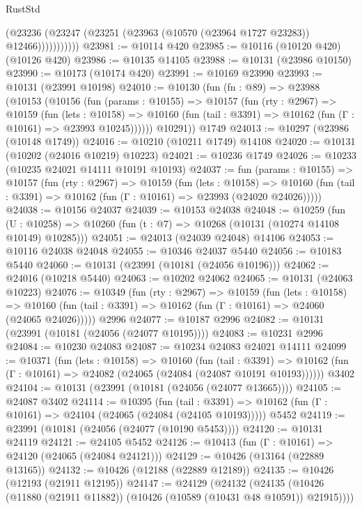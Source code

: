 \begin{lexlean}{RustStd}
\begin{coremodule}
                  (@23236 (@23247 (@23251 (@23963 (@10570 (@23964 @1727 @23283)) @12466)))))))))))
@23981 := @10114 @420
@23985 := @10116 (@10120 @420) (@10126 @420)
@23986 := @10135 @14105
@23988 := @10131 (@23986 @10150)
@23990 := @10173 (@10174 @420)
@23991 := @10169 @23990
@23993 := @10131 (@23991 @10198)
@24010 := @10130
    (fun (fn : @89) =>
    @23988
      (@10153
        (@10156
          (fun (params : @10155) =>
          @10157
            (fun (rty : @2967) =>
            @10159
              (fun (lets : @10158) =>
              @10160 (fun (tail : @3391) => @10162 (fun (Γ : @10161) => @23993 @10245))))))
        @10291))
    @1749
@24013 := @10297 (@23986 (@10148 @1749))
@24016 := @10210 (@10211 @1749) @14108
@24020 := @10131 (@10202 (@24016 @10219) @10223)
@24021 := @10236 @1749
@24026 := @10233 (@10235 @24021 @14111 @10191 @10193)
@24037 := fun (params : @10155) =>
  @10157
    (fun (rty : @2967) =>
    @10159
      (fun (lets : @10158) =>
      @10160 (fun (tail : @3391) => @10162 (fun (Γ : @10161) => @23993 (@24020 @24026)))))
@24038 := @10156 @24037
@24039 := @10153 @24038
@24048 := @10259
    (fun (U : @10258) => @10260 (fun (t : @7) => @10268 (@10131 (@10274 @14108 @10149) @10285)))
@24051 := @24013 (@24039 @24048) @14106
@24053 := @10116 @24038 @24048
@24055 := @10346 @24037 @5440
@24056 := @10183 @5440
@24060 := @10131 (@23991 (@10181 (@24056 @10196)))
@24062 := @24016 (@10218 @5440)
@24063 := @10202 @24062
@24065 := @10131 (@24063 @10223)
@24076 := @10349
    (fun (rty : @2967) =>
    @10159
      (fun (lets : @10158) =>
      @10160 (fun (tail : @3391) => @10162 (fun (Γ : @10161) => @24060 (@24065 @24026)))))
    @2996
@24077 := @10187 @2996
@24082 := @10131 (@23991 (@10181 (@24056 (@24077 @10195))))
@24083 := @10231 @2996
@24084 := @10230 @24083
@24087 := @10234 @24083 @24021 @14111
@24099 := @10371
    (fun (lets : @10158) =>
    @10160
      (fun (tail : @3391) =>
      @10162 (fun (Γ : @10161) => @24082 (@24065 (@24084 (@24087 @10191 @10193))))))
    @3402
@24104 := @10131 (@23991 (@10181 (@24056 (@24077 @13665))))
@24105 := @24087 @3402
@24114 := @10395
    (fun (tail : @3391) => @10162 (fun (Γ : @10161) => @24104 (@24065 (@24084 (@24105 @10193)))))
    @5452
@24119 := @23991 (@10181 (@24056 (@24077 (@10190 @5453))))
@24120 := @10131 @24119
@24121 := @24105 @5452
@24126 := @10413 (fun (Γ : @10161) => @24120 (@24065 (@24084 @24121)))
@24129 := @10426 (@13164 (@22889 @13165))
@24132 := @10426 (@12188 (@22889 @12189))
@24135 := @10426 (@12193 (@21911 @12195))
@24147 := @24129
    (@24132 (@24135 (@10426 (@11880 (@21911 @11882)) (@10426 (@10589 (@10431 @48 @10591)) @21915))))

\end{coremodule}
\end{lexlean}
